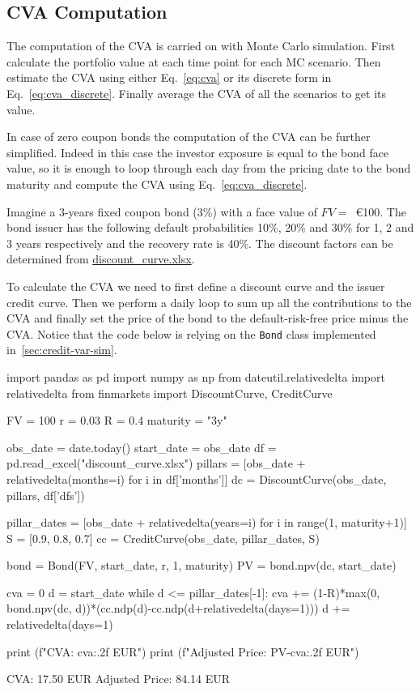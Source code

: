 \subsection{CVA Computation}

The computation of the CVA is carried on with Monte Carlo simulation. 
First calculate the portfolio value at each time point for each MC scenario. Then estimate the CVA using either Eq.~\ref{eq:cva} or its discrete form in Eq.~\ref{eq:cva_discrete}. Finally average the CVA of all the scenarios to get its value.

In case of zero coupon bonds the computation of the CVA can be further simplified. Indeed in this case the investor exposure is equal to the bond face value, so it is enough to loop through each day from the pricing date to the bond maturity and compute the CVA using Eq.~\ref{eq:cva_discrete}.

Imagine a 3-years fixed coupon bond (3\%) with a face value of $FV=$~\euro{100}. The bond issuer has the following default probabilities 10\%, 20\% and 30\% for 1, 2 and 3 years respectively and the recovery rate is 40\%. The discount factors can be determined from \href{https://github.com/matteosan1/finance_course/raw/master/input_files/discount_factors_2022-10-05.xlsx}{discount\_curve.xlsx}. 

To calculate the CVA we need to first define a discount curve and the issuer credit curve. Then we perform a daily loop to sum up all the contributions to the CVA and finally set the price of the bond to the default-risk-free price minus the CVA.
Notice that the code below is relying on the \texttt{Bond} class implemented in~\ref{sec:credit-var-sim}.

\begin{ipython}
import pandas as pd
import numpy as np
from dateutil.relativedelta import relativedelta
from finmarkets import DiscountCurve, CreditCurve

FV = 100
r = 0.03
R = 0.4
maturity = "3y"

obs_date = date.today()
start_date = obs_date
df = pd.read_excel("discount_curve.xlsx")
pillars = [obs_date + relativedelta(months=i) for i in df['months']]
dc = DiscountCurve(obs_date, pillars, df['dfs'])

pillar_dates = [obs_date + relativedelta(years=i) for i in range(1, maturity+1)]
S = [0.9, 0.8, 0.7]
cc = CreditCurve(obs_date, pillar_dates, S)

bond = Bond(FV, start_date, r, 1, maturity)
PV = bond.npv(dc, start_date)

cva = 0
d = start_date
while d <= pillar_dates[-1]:
    cva += (1-R)*max(0, bond.npv(dc, d))*(cc.ndp(d)-cc.ndp(d+relativedelta(days=1)))
    d += relativedelta(days=1)

print (f"CVA: {cva:.2f} EUR")
print (f"Adjusted Price: {PV-cva:.2f} EUR")
\end{ipython}
\begin{ioutput}
CVA: 17.50 EUR
Adjusted Price: 84.14 EUR
\end{ioutput}


